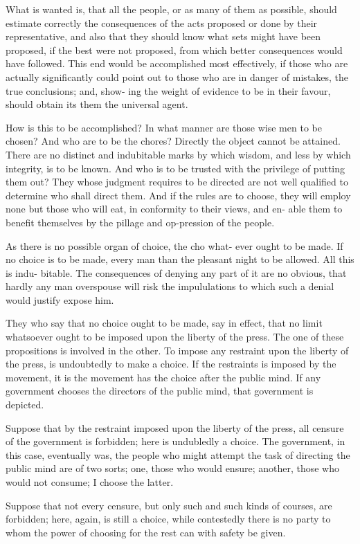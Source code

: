 \documentclass{article}
\begin{document}
What is wanted is, that all the people, or as many of them as possible, should estimate correctly the consequences of the acts proposed or done by their representative, and also that they should know what sets might have been proposed, if the best were not proposed, from which better consequences would have followed. This end would be accomplished most effectively, if those who are actually significantly could point out to those who are in danger of mistakes, the true conclusions; and, show- ing the weight of evidence to be in their favour, should obtain its them the universal agent.

How is this to be accomplished? In what manner are those wise men to be chosen? And who are to be the chores? Directly the object cannot be attained. There are no distinct and indubitable marks by which wisdom, and less by which integrity, is to be known. And who is to be trusted with the privilege of putting them out? They whose judgment requires to be directed are not well qualified to determine who shall direct them. And if the rules are to choose, they will employ none but those who will eat, in conformity to their views, and en- able them to benefit themselves by the pillage and op-pression of the people.

As there is no possible organ of choice, the cho what- ever ought to be made. If no choice is to be made, every man than the pleasant night to be allowed. All this is indu- bitable. The consequences of denying any part of it are no obvious, that hardly any man overspouse will risk the impululations to which such a denial would justify expose him.

They who say that no choice ought to be made, say in effect, that no limit whatsoever ought to be imposed upon the liberty of the press. The one of these propositions is involved in the other. To impose any restraint upon the liberty of the press, is undoubtedly to make a choice. If the restraints is imposed by the movement, it is the movement has the choice after the public mind. If any government chooses the directors of the public mind, that government is depicted.

Suppose that by the restraint imposed upon the liberty of the press, all censure of the government is forbidden; here is undubledly a choice. The government, in this case, eventually was, the people who might attempt the task of directing the public mind are of two sorts; one, those who would ensure; another, those who would not consume; I choose the latter.

Suppose that not every censure, but only such and such kinds of courses, are forbidden; here, again, is still a choice, while contestedly there is no party to whom the power of choosing for the rest can with safety be given.
\end{document}
